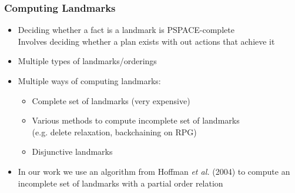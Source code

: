 \documentclass{beamer}
\begin{document}
	\begin{frame}[c]\frametitle{Computing Landmarks}
		\begin{itemize}
			\item Deciding whether a fact is a landmark is PSPACE-complete\\
				Involves deciding whether a plan exists with out actions that achieve it
			\item Multiple types of landmarks/orderings
			\item Multiple ways of computing landmarks:
			\begin{itemize}
				\item Complete set of landmarks (very expensive)
				\item Various methods to compute incomplete set of landmarks \\(e.g. delete relaxation, backchaining on RPG)
				\item Disjunctive landmarks
			\end{itemize}
			\item In our work we use an algorithm from Hoffman \emph{et al.} (2004) to compute an incomplete set of landmarks with a partial order relation
		\end{itemize}
	\end{frame}
\fi

\end{document}
